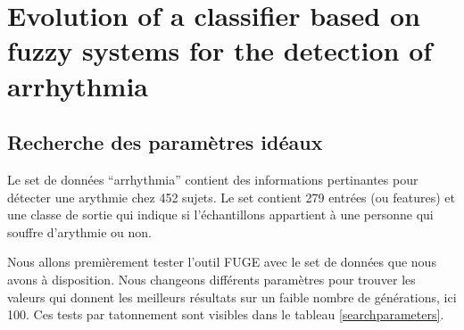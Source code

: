 \chapter*{Evolution of a classifier based on fuzzy systems for the detection of arrhythmia}
\section*{Recherche des paramètres idéaux}

Le set de données ``arrhythmia'' contient des informations pertinantes pour détecter une arythmie chez 452 sujets. Le set contient 279 entrées (ou features) et une classe de sortie qui indique si l'échantillons appartient à une personne qui souffre d'arythmie ou non.

Nous allons premièrement tester l'outil FUGE avec le set de données que nous avons à disposition. Nous changeons différents paramètres pour trouver les valeurs qui donnent les meilleurs résultats sur un faible nombre de générations, ici 100. Ces tests par tatonnement sont visibles dans le tableau \ref{searchparameters}.

